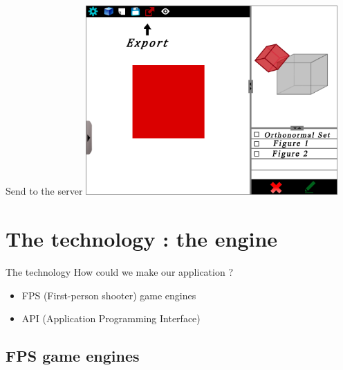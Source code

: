 \documentclass[a4paper,10pt]{beamer}
\begin{document}
			\begin{frame}{Send to the server}
				\includegraphics[height=205pt]{maquette/maquette_8.png}
			\end{frame}
			
		
		
	\section{The technology : the engine}
			
			\begin{frame}{The technology}
				How could we make our application ?
				\begin{itemize}
					\item FPS (First-person shooter) game engines
					\item API (Application Programming Interface)

				\end{itemize}
			\end{frame}
			
		\subsection{FPS game engines}
		
\end{document}
